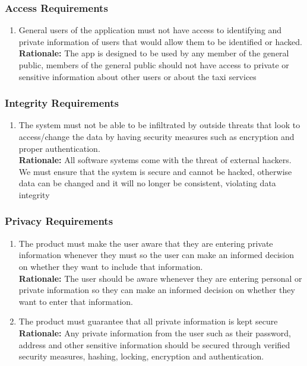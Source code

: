 \documentclass[]{article}
\begin{document}
\subsubsection{Access Requirements}
\label{ssub:access_requirements}
\begin{enumerate}[{SR-AC}1. ]
	\item General users of the application must not have access to identifying and private information of users that would allow them to be identified or hacked. \\
	{\bf Rationale:} The app is designed to be used by any member of the general public, members of the general public should not have access to private or sensitive information about other users or about the taxi services 
\end{enumerate}

\subsubsection{Integrity Requirements}
\label{ssub:integrity_requirements}
\begin{enumerate}[{SR-INT}1. ]
	\item The system must not be able to be infiltrated by outside threats that look to access/change the data by having security measures such as encryption and proper authentication. \\
	{\bf Rationale:} All software systems come with the threat of external hackers. We must ensure that the system is secure and cannot be hacked, otherwise data can be changed and it will no longer be consistent, violating data integrity 
\end{enumerate}

\subsubsection{Privacy Requirements}
\label{ssub:privacy_requirements}
\begin{enumerate}[{SR-P}1. ]
	\item The product must make the user aware that they are entering private information whenever they must so the user can make an informed decision on whether they want to include that information. \\
	{\bf Rationale:} The user should be aware whenever they are entering personal or private information so they can make an informed decision on whether they want to enter that information.
	\item The product must guarantee that all private information is kept secure \\
	{\bf Rationale:} Any private information from the user such as their password, address and other sensitive information should be secured through verified security measures, hashing, locking, encryption and authentication.
\end{enumerate}
\end{document}
